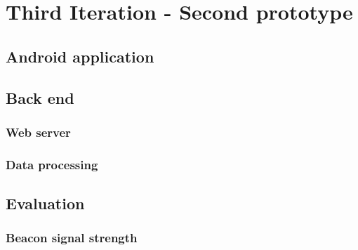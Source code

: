 \documentclass[../Main/thesis.tex]{subfiles}
\begin{document}
\chapter{Third Iteration  - Second prototype}
\label{ch:development-2}

\section{Android application}

\section{Back end}
\subsection{Web server}
\subsection{Data processing}

\section{Evaluation}
\subsection{Beacon signal strength}
\end{document}
